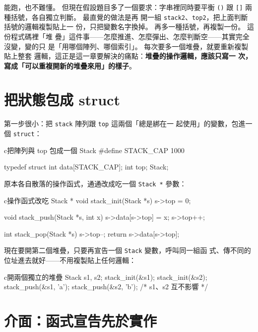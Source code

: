 能跑，也不難懂。 但現在假設題目多了一個要求：字串裡同時要平衡
\texttt{()} 跟 \texttt{[]} 兩種括號，各自獨立判斷。 最直覺的做法是再
開一組 \texttt{stack2}、\texttt{top2}，把上面判斷括號的邏輯複製貼上一
份，只把變數名字換掉。 再多一種括號，再複製一份。 這份程式碼裡「堆
疊」這件事——怎麼推進、怎麼彈出、怎麼判斷空——其實完全沒變，變的只
是「用哪個陣列、哪個索引」。 每次要多一個堆疊，就要重新複製貼上整套
邏輯，這正是這一章要解決的痛點：\textbf{堆疊的操作邏輯，應該只寫一
次，寫成「可以重複開新的堆疊來用」的樣子}。

\section{把狀態包成 struct}
\label{sec:obj-struct}

第一步很小：把 \texttt{stack} 陣列跟 \texttt{top} 這兩個「總是綁在一
起使用」的變數，包進一個 \texttt{struct}：

\begin{code}{c}{把陣列與 top 包成一個 Stack}
#define STACK_CAP 1000

typedef struct {
    int data[STACK_CAP];
    int top;
} Stack;
\end{code}

原本各自散落的操作函式，通通改成吃一個 \texttt{Stack *} 參數：

\begin{code}{c}{操作函式改吃 Stack *}
void stack_init(Stack *s) {
    s->top = 0;
}

void stack_push(Stack *s, int x) {
    s->data[s->top] = x;
    s->top++;
}

int stack_pop(Stack *s) {
    s->top--;
    return s->data[s->top];
}
\end{code}

現在要開第二個堆疊，只要再宣告一個 \texttt{Stack} 變數，呼叫同一組函
式、傳不同的位址進去就好——不用複製貼上任何邏輯：

\begin{code}{c}{開兩個獨立的堆疊}
Stack s1, s2;
stack_init(&s1);
stack_init(&s2);
stack_push(&s1, 'a');
stack_push(&s2, 'b'); /* s1、s2 互不影響 */
\end{code}


\section{介面：函式宣告先於實作}
\label{sec:obj-interface}

